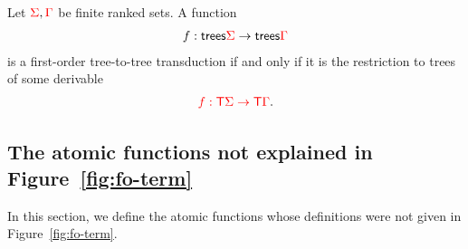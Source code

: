 




\begin{theorem}\label{thm:main}
    Let ${\color{red}{\Sigma}},{\color{red}{\Gamma}}$ be finite ranked sets. A function 
    \begin{align*}
        f : \mathsf {trees} {\color{red}{\Sigma}} \to \mathsf {trees} {\color{red}{\Gamma}}
    \end{align*}
    is a first-order tree-to-tree transduction if and only if it is the restriction to trees of some derivable
    \begin{align*}
        {\color{red}{f : {\color{red}{\mathsf T}}\Sigma \to {\color{red}{\mathsf T}}\Gamma}}.
    \end{align*}
    
\end{theorem}




\subsection{The atomic functions not explained in Figure~\ref{fig:fo-term}}
\label{sec:atomic-and-combinators}
In this section, we define the atomic functions whose definitions were not given in Figure~\ref{fig:fo-term}. 




